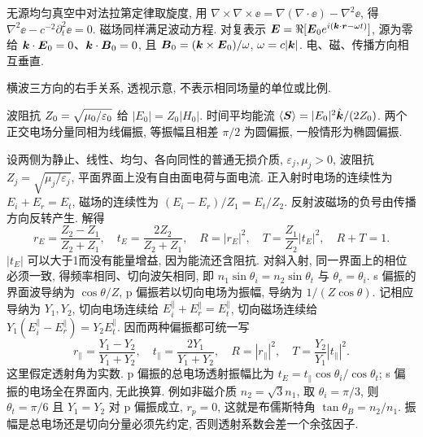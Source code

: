 无源均匀真空中对法拉第定律取旋度, 用 $\nabla\times\nabla\times\ee=\nabla(\nabla\cdot\ee)-\nabla^2\ee$, 得 $\nabla^2\ee-c^{-2}\partial_t^2\ee=0$. 磁场同样满足波动方程. 对复表示 $\boldsymbol{E}=\Re[\boldsymbol{E}_0e^{i(\boldsymbol{k}\cdot\boldsymbol{r}-\omega t)}]$, 源为零给 $\boldsymbol{k}\cdot\boldsymbol{E}_0=0$、$\boldsymbol{k}\cdot\boldsymbol{B}_0=0$, 且 $\boldsymbol{B}_0=(\boldsymbol{k}\times\boldsymbol{E}_0)/\omega$, $\omega=c|\boldsymbol{k}|$. 电、磁、传播方向相互垂直.

\begin{center}
\par
横波三方向的右手关系, 透视示意, 不表示相同场量的单位或比例.
\end{center}
波阻抗 $Z_0=\sqrt{\mu_0/\varepsilon_0}$ 给 $|E_0|=Z_0|H_0|$. 时间平均能流 $\langle\boldsymbol{S}\rangle=|E_0|^2\hat{\boldsymbol{k}}/(2Z_0)$. 两个正交电场分量同相为线偏振, 等振幅且相差 $\pi/2$ 为圆偏振, 一般情形为椭圆偏振.

设两侧为静止、线性、均匀、各向同性的普通无损介质, $\varepsilon_j,\mu_j>0$, 波阻抗 $Z_j=\sqrt{\mu_j/\varepsilon_j}$, 平面界面上没有自由面电荷与面电流. 正入射时电场的连续性为 $E_i+E_r=E_t$, 磁场的连续性为 $(E_i-E_r)/Z_1=E_t/Z_2$. 反射波磁场的负号由传播方向反转产生. 解得
\[
r_E=\frac{Z_2-Z_1}{Z_2+Z_1},\quad t_E=\frac{2Z_2}{Z_2+Z_1},\quad
R=|r_E|^2,\quad T=\frac{Z_1}{Z_2}|t_E|^2,\quad R+T=1.
\]
$|t_E|$ 可以大于1而没有能量增益, 因为能流还含阻抗. 对斜入射, 同一界面上的相位必须一致, 得频率相同、切向波矢相同, 即 $n_1\sin\theta_i=n_2\sin\theta_t$ 与 $\theta_r=\theta_i$. s 偏振的界面波导纳为 $\cos\theta/Z$, p 偏振若以切向电场为振幅, 导纳为 $1/(Z\cos\theta)$. 记相应导纳为 $Y_1,Y_2$, 切向电场连续给 $E_i^\parallel+E_r^\parallel=E_t^\parallel$, 切向磁场连续给 $Y_1(E_i^\parallel-E_r^\parallel)=Y_2E_t^\parallel$. 因而两种偏振都可统一写
\[
r_\parallel=\frac{Y_1-Y_2}{Y_1+Y_2},\quad
 t_\parallel=\frac{2Y_1}{Y_1+Y_2},\quad
 R=|r_\parallel|^2,\quad T=\frac{Y_2}{Y_1}|t_\parallel|^2.
\]
这里假定透射角为实数. p 偏振的总电场透射振幅比为 $t_E=t_\parallel\cos\theta_i/\cos\theta_t$; s 偏振的电场全在界面内, 无此换算. 例如非磁介质 $n_2=\sqrt3n_1$, 取 $\theta_i=\pi/3$, 则 $\theta_t=\pi/6$ 且 $Y_1=Y_2$ 对 p 偏振成立, $r_p=0$, 这就是布儒斯特角 $\tan\theta_B=n_2/n_1$. 振幅是总电场还是切向分量必须先约定, 否则透射系数会差一个余弦因子.

